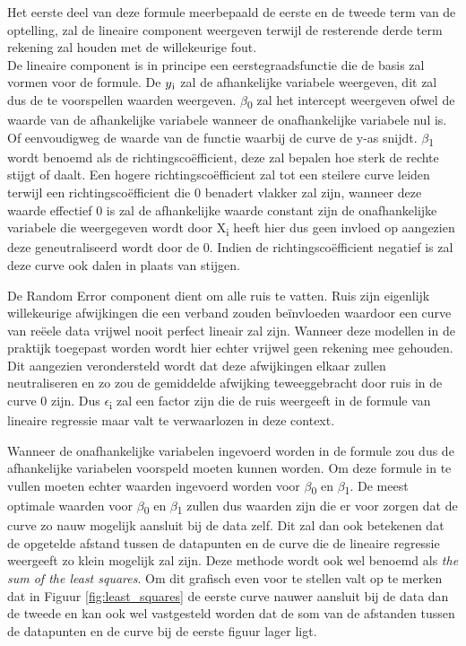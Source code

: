 Het eerste deel van deze formule meerbepaald de eerste en de tweede term van de optelling, zal de lineaire component weergeven terwijl de resterende derde term rekening zal houden met de willekeurige fout.\\ 

De lineaire component is in principe een eerstegraadsfunctie die de basis zal vormen voor de formule. De $y\textsubscript{i}$ zal de afhankelijke variabele weergeven, dit zal dus de te voorspellen waarden weergeven. $\beta$\textsubscript{0} zal het intercept weergeven ofwel de waarde van de afhankelijke variabele wanneer de onafhankelijke variabele nul is. Of eenvoudigweg de waarde van de functie waarbij de curve de y-as snijdt. $\beta$\textsubscript{1} wordt benoemd als de richtingsco\"{e}fficient, deze zal bepalen hoe sterk de rechte stijgt of daalt. Een hogere richtingsco\"{e}fficient zal tot een steilere curve leiden terwijl een richtingsco\"{e}fficient die 0 benadert vlakker zal zijn, wanneer deze waarde effectief 0 is zal de afhankelijke waarde constant zijn de onafhankelijke variabele die weergegeven wordt door X\textsubscript{i} heeft hier dus geen invloed op aangezien deze geneutraliseerd wordt door de 0. Indien de richtingsco\"{e}fficient negatief is zal deze curve ook dalen in plaats van stijgen.

De Random Error component dient om alle ruis te vatten. Ruis zijn eigenlijk willekeurige afwijkingen die een verband zouden be\"{i}nvloeden waardoor een curve van re\"{e}ele data vrijwel nooit perfect lineair zal zijn. Wanneer deze modellen in de praktijk toegepast worden wordt hier echter vrijwel geen rekening mee gehouden. Dit aangezien verondersteld wordt dat deze afwijkingen elkaar zullen neutraliseren en zo zou de gemiddelde afwijking teweeggebracht door ruis in de curve 0 zijn. Dus $\epsilon$\textsubscript{i} zal een factor zijn die de ruis weergeeft in de formule van lineaire regressie maar valt te verwaarlozen in deze context.

Wanneer de onafhankelijke variabelen ingevoerd worden in de formule zou dus de afhankelijke variabelen voorspeld moeten kunnen worden. Om deze formule in te vullen moeten echter waarden ingevoerd worden voor $\beta$\textsubscript{0} en $\beta$\textsubscript{1}. De meest optimale waarden voor $\beta$\textsubscript{0} en $\beta$\textsubscript{1} zullen dus waarden zijn die er voor zorgen dat de curve zo nauw mogelijk aansluit bij de data zelf. Dit zal dan ook betekenen dat de opgetelde afstand tussen de datapunten en de curve die de lineaire regressie weergeeft zo klein mogelijk zal zijn. Deze methode wordt ook wel benoemd als \textit{the sum of the least squares}. Om dit grafisch even voor te stellen valt op te merken dat in Figuur \ref{fig:least_squares} de eerste curve nauwer aansluit bij de data dan de tweede en kan ook wel vastgesteld worden dat de som van de afstanden tussen de datapunten en de curve bij de eerste figuur lager ligt.


